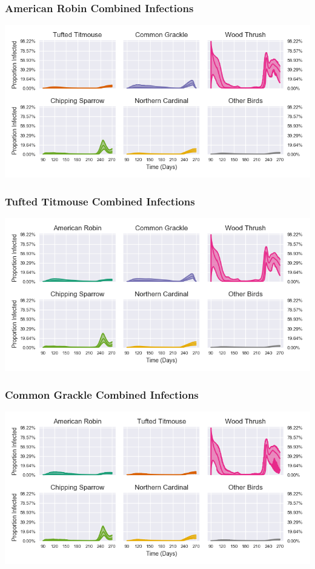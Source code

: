 \documentclass{beamer}
\begin{document}
\begin{frame}
\frametitle{American Robin Combined Infections}
\includegraphics[width=\linewidth]{[0,6]_infections.png}
\end{frame}

\begin{frame}
\frametitle{Tufted Titmouse Combined Infections}
\includegraphics[width=\linewidth]{[1,6]_infections.png}
\end{frame}

\begin{frame}
\frametitle{Common Grackle Combined Infections}
\includegraphics[width=\linewidth]{[2,6]_infections.png}
\end{frame}
\end{document}
